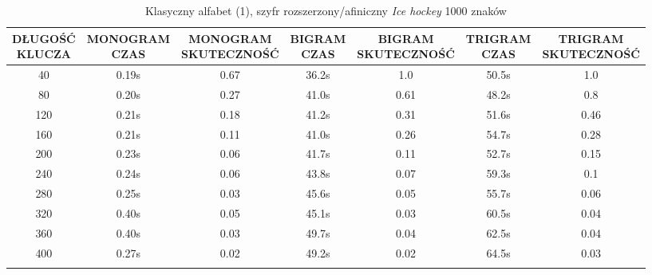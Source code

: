 \documentclass[a4paper]{article}
\theoremstyle{defn}
\theoremstyle{theorem}
\theoremstyle{lemma}
\theoremstyle{cor}
\theoremstyle{fact}
\begin{document}
\begin{center}\begin{small}\begin{longtable}{|c|c|c|c|c|c|c|} 
\hline \makecell{DŁUGOŚĆ\\KLUCZA} &  \makecell{MONOGRAM\\CZAS} & \makecell{MONOGRAM\\SKUTECZNOŚĆ} & \makecell{BIGRAM\\CZAS} &  \makecell{BIGRAM\\SKUTECZNOŚĆ} & \makecell{TRIGRAM\\CZAS} & \makecell{TRIGRAM\\SKUTECZNOŚĆ}\\ \hline 
40 & 0.19s & 0.67 & 36.2s & 1.0 & 50.5s & 1.0 \\ \hline 
80 & 0.20s & 0.27 & 41.0s & 0.61 & 48.2s & 0.8 \\ \hline 
120 & 0.21s & 0.18 & 41.2s & 0.31 & 51.6s & 0.46 \\ \hline 
160 & 0.21s & 0.11 & 41.0s & 0.26 & 54.7s & 0.28 \\ \hline 
200 & 0.23s & 0.06 & 41.7s & 0.11 & 52.7s & 0.15 \\ \hline 
240 & 0.24s & 0.06 & 43.8s & 0.07 & 59.3s & 0.1 \\ \hline 
280 & 0.25s & 0.03 & 45.6s & 0.05 & 55.7s & 0.06 \\ \hline 
320 & 0.40s & 0.05 & 45.1s & 0.03 & 60.5s & 0.04 \\ \hline 
360 & 0.40s & 0.03 & 49.7s & 0.04 & 62.5s & 0.04 \\ \hline 
400 & 0.27s & 0.02 & 49.2s & 0.02 & 64.5s & 0.03 \\ \hline 
\caption{Klasyczny alfabet (1), szyfr rozszerzony/afiniczny \textit{Ice hockey} 1000 znaków}
\end{longtable}\end{small}\end{center} 
\end{document}
